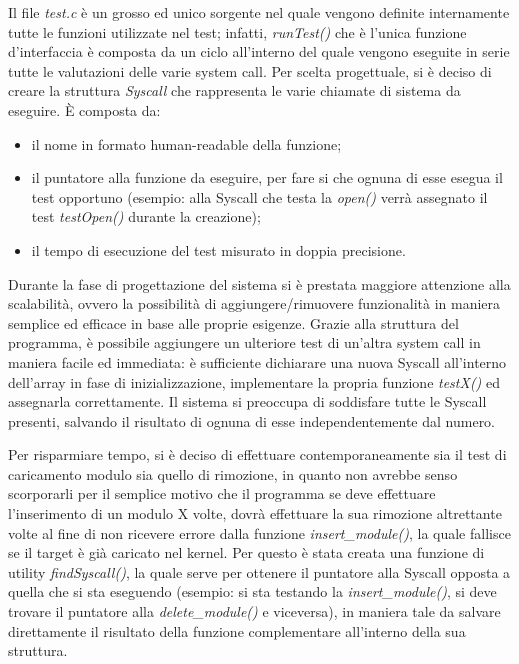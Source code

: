 Il file \emph{test.c} è un grosso ed unico sorgente nel quale vengono definite internamente tutte le funzioni utilizzate nel test; infatti, \emph{runTest()} che è l'unica funzione d'interfaccia è composta da un ciclo all'interno del quale vengono eseguite in serie tutte le valutazioni delle varie system call. Per scelta progettuale, si è deciso di creare la struttura \emph{Syscall} che rappresenta le varie chiamate di sistema da eseguire. È composta da:

\begin{itemize}
\item il nome in formato human-readable della funzione;
\item il puntatore alla funzione da eseguire, per fare si che ognuna di esse esegua il test opportuno (esempio: alla Syscall che testa la \emph{open()} verrà assegnato il test \emph{testOpen()} durante la creazione);
\item il tempo di esecuzione del test misurato in doppia precisione.
\end{itemize}

Durante la fase di progettazione del sistema si è prestata maggiore attenzione alla scalabilità, ovvero la possibilità di aggiungere/rimuovere funzionalità in maniera semplice ed efficace in base alle proprie esigenze. Grazie alla struttura del programma, è possibile aggiungere un ulteriore test di un'altra system call in maniera facile ed immediata: è sufficiente dichiarare una nuova Syscall all'interno dell'array in fase di inizializzazione, implementare la propria funzione \emph{testX()} ed assegnarla correttamente. Il sistema si preoccupa di soddisfare tutte le Syscall presenti, salvando il risultato di ognuna di esse independentemente dal numero.

Per risparmiare tempo, si è deciso di effettuare contemporaneamente sia il test di caricamento modulo sia quello di rimozione, in quanto non avrebbe senso scorporarli per il semplice motivo che il programma se deve effettuare l'inserimento di un modulo X volte, dovrà effettuare la sua rimozione altrettante volte al fine di non ricevere errore dalla funzione \emph{insert\_module()}, la quale fallisce se il target è già caricato nel kernel. Per questo è stata creata una funzione di utility \emph{findSyscall()}, la quale serve per ottenere il puntatore alla Syscall opposta a quella che si sta eseguendo (esempio: si sta testando la \emph{insert\_module()}, si deve trovare il puntatore alla \emph{delete\_module()} e viceversa), in maniera tale da salvare direttamente il risultato della funzione complementare all'interno della sua struttura.

